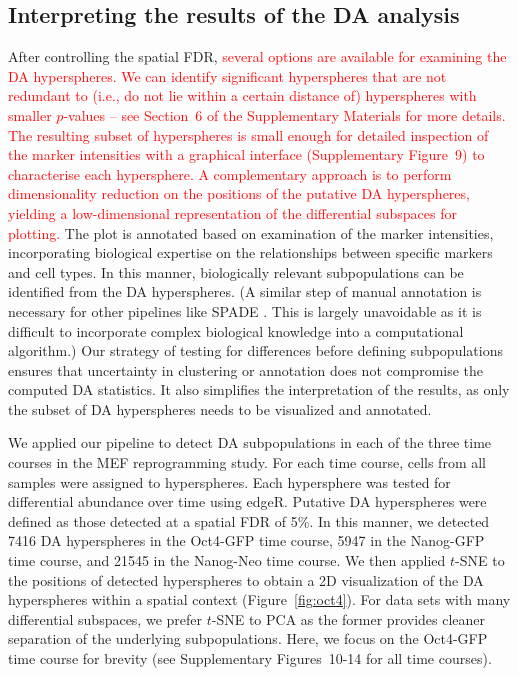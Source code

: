 \documentclass{article}
\newcommand\revised[1]{\textcolor{red}{#1}}
\newcommand{\suppinterpret}{6}
\newcommand{\suppfiginterpret}{9}
\newcommand{\suppfigrealextra}{10-14}
\begin{document}
\subsection{Interpreting the results of the DA analysis}
After controlling the spatial FDR, \revised{several options are available for examining the DA hyperspheres.
We can identify significant hyperspheres that are not redundant to (i.e., do not lie within a certain distance of) hyperspheres with smaller $p$-values -- see Section~\suppinterpret{} of the Supplementary Materials for more details.
The resulting subset of hyperspheres is small enough for detailed inspection of the marker intensities with a graphical interface (Supplementary Figure~\suppfiginterpret{}) to characterise each hypersphere.
A complementary approach is to perform dimensionality reduction on the positions of the putative DA hyperspheres, yielding a low-dimensional representation of the differential subspaces for plotting.}
The plot is annotated based on examination of the marker intensities, incorporating biological expertise on the relationships between specific markers and cell types.
In this manner, biologically relevant subpopulations can be identified from the DA hyperspheres.
(A similar step of manual annotation is necessary for other pipelines like SPADE \cite{anchang2016visualization}.
This is largely unavoidable as it is difficult to incorporate complex biological knowledge into a computational algorithm.)
Our strategy of testing for differences before defining subpopulations ensures that uncertainty in clustering or annotation does not compromise the computed DA statistics.
It also simplifies the interpretation of the results, as only the subset of DA hyperspheres needs to be visualized and annotated.

We applied our pipeline to detect DA subpopulations in each of the three time courses in the MEF reprogramming study.
For each time course, cells from all samples were assigned to hyperspheres.
Each hypersphere was tested for differential abundance over time using edgeR.
Putative DA hyperspheres were defined as those detected at a spatial FDR of 5\%.
In this manner, we detected 7416 DA hyperspheres in the Oct4-GFP time course, 5947 in the Nanog-GFP time course, and 21545 in the Nanog-Neo time course.
We then applied $t$-SNE \cite{van2008visualizing} to the positions of detected hyperspheres to obtain a 2D visualization of the DA hyperspheres within a spatial context (Figure~\ref{fig:oct4}).
For data sets with many differential subspaces, we prefer $t$-SNE to PCA as the former provides cleaner separation of the underlying subpopulations.
Here, we focus on the Oct4-GFP time course for brevity (see Supplementary Figures~\suppfigrealextra{} for all time courses).
\end{document}
